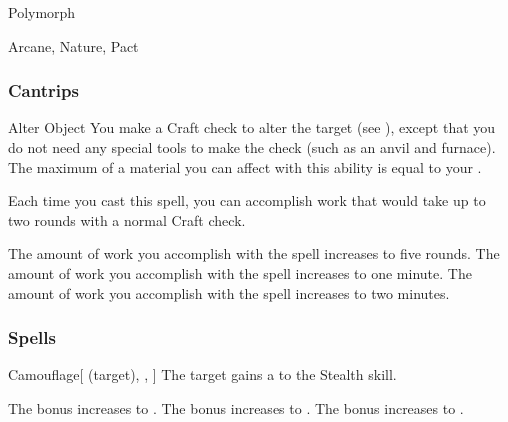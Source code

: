 \newpage
\begin{spellsection}{Polymorph}

\begin{spellheader}
\end{spellheader}


 Arcane, Nature, Pact

\subsubsection{Cantrips}


\begin{freeability}{Alter Object}
You make a Craft check to alter the target (see ), except that you do not need any special tools to make the check (such as an anvil and furnace).
The maximum  of a material you can affect with this ability is equal to your .

Each time you cast this spell, you can accomplish work that would take up to two rounds with a normal Craft check.

\rankline
{} The amount of work you accomplish with the spell increases to five rounds.
 The amount of work you accomplish with the spell increases to one minute.
 The amount of work you accomplish with the spell increases to two minutes.
\end{freeability}

\end{spellsection}


\subsubsection{Spells}


\lowercase{\hypertarget{spell:Camouflage}{}}\label{spell:Camouflage}
\begin{attuneability}[Rank 1]{\hypertarget{spell:Camouflage}{Camouflage}}[ (target), , ]
The target gains a   to the Stealth skill.

\rankline
{} The bonus increases to .
 The bonus increases to .
 The bonus increases to .
\end{attuneability}
\vspace{0.25em}



